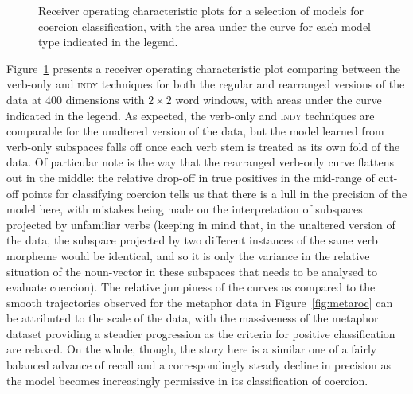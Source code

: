 \begin{figure}
\caption[Receiver Operating Characterisation for Coercion Classification]{Receiver operating characteristic plots for a selection of models for coercion classification, with the area under the curve for each model type indicated in the legend.}
\label{fig:coerroc}
\end{figure}

Figure~\ref{fig:coerroc} presents a receiver operating characteristic plot comparing between the verb-only and \textsc{indy} techniques for both the regular and rearranged versions of the data at 400 dimensions with $2 \times 2$ word windows, with areas under the curve indicated in the legend.  As expected, the verb-only and \textsc{indy} techniques are comparable for the unaltered version of the data, but the model learned from verb-only subspaces falls off once each verb stem is treated as its own fold of the data.  Of particular note is the way that the rearranged verb-only curve flattens out in the middle: the relative drop-off in true positives in the mid-range of cut-off points for classifying coercion tells us that there is a lull in the precision of the model here, with mistakes being made on the interpretation of subspaces projected by unfamiliar verbs (keeping in mind that, in the unaltered version of the data, the subspace projected by two different instances of the same verb morpheme would be identical, and so it is only the variance in the relative situation of the noun-vector in these subspaces that needs to be analysed to evaluate coercion).  The relative jumpiness of the curves as compared to the smooth trajectories observed for the metaphor data in Figure~\ref{fig:metaroc} can be attributed to the scale of the data, with the massiveness of the metaphor dataset providing a steadier progression as the criteria for positive classification are relaxed.  On the whole, though, the story here is a similar one of a fairly balanced advance of recall and a correspondingly steady decline in precision as the model becomes increasingly permissive in its classification of coercion.

